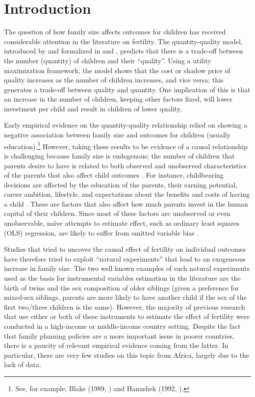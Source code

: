 
\section{Introduction}

The question of how family size affects outcomes for children has received considerable attention in the literature on fertility. The quantity-quality model, introduced by \textcite{Becker1960} and formalized in \textcite{Becker1973} and \textcite{Becker1976}, predicts that there is a trade-off between the number (quantity) of children and their “quality”. Using a utility maximization framework, the model shows that the cost or shadow price of quality increases as the number of children increases, and vice versa; this generates a trade-off between quality and quantity. One implication of this is that an increase in the number of children, keeping other factors fixed, will lower investment per child and result in children of lower quality.

Early empirical evidence on the quantity-quality relationship relied on showing a negative association between family size and outcomes for children (usually education).\footnote{See, for example, Blake (1989, \cite[cited in][]{Black2010}) and Hanushek (1992, \cite[cited in][]{angrist_multiple_2010}).}  However, taking these results to be evidence of a causal relationship is challenging because family size is endogenous; the number of children that parents desire to have is related to both observed and unobserved characteristics of the parents that also affect child outcomes \parencite{Black2010}. For instance, childbearing decisions are affected by the education of the parents, their earning potential, career ambition, lifestyle, and expectations about the benefits and costs of having a child \parencite{Angrist2006,oberg_casual_2021}. These are factors that also affect how much parents invest in the human capital of their children. Since most of these factors are unobserved or even unobservable, naïve attempts to estimate effect, such as ordinary least squares (OLS) regression, are likely to suffer from omitted variable bias \parencite{oberg_casual_2021}.

Studies that tried to uncover the causal effect of fertility on individual outcomes have therefore tried to exploit “natural experiments” that lead to an exogeneous increase in family size. The two well known examples of such natural experiments used as the basis for instrumental variables estimation in the literature are the birth of twins and the sex composition of older siblings (given a preference for mixed-sex siblings, parents are more likely to have another child if the sex of the first two/three children is the same). However, the majority of previous research that use either or both of these instruments to estimate the effect of fertility were conducted in a high-income or middle-income country setting. Despite the fact that family planning policies are a more important issue in poorer countries, there is a paucity of relevant empirical evidence coming from the latter. In particular, there are very few studies on this topic from Africa, largely due to the lack of data. 

